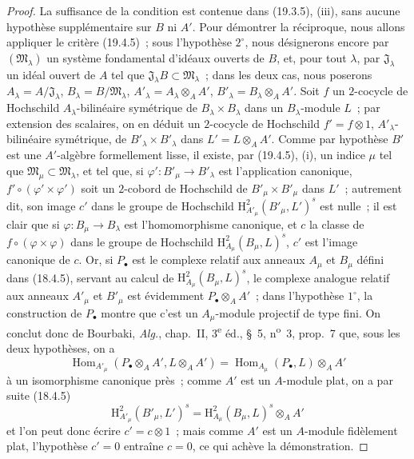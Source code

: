 \begin{proof}
La suffisance de la condition est contenue dans (19.3.5), (iii), sans aucune
hypothèse supplémentaire sur $B$ ni $A'$. Pour démontrer la réciproque, nous
allons appliquer le critère (19.4.5)~; sous l'hypothèse $2^\circ$, nous
désignerons encore par $(\mathfrak M_\lambda)$ un système fondamental
d'idéaux ouverts de $B$, et, pour tout $\lambda$, par
$\mathfrak J_\lambda$ un idéal ouvert de $A$ tel que
$\mathfrak J_\lambda B\subset\mathfrak M_\lambda$~; dans les deux
cas, nous poserons
$A_\lambda=A/\mathfrak J_\lambda$,
$B_\lambda=B/\mathfrak M_\lambda$,
$A'_\lambda=A_\lambda\otimes_A A'$,
$B'_\lambda=B_\lambda\otimes_A A'$. Soit $f$ un $2$-cocycle de
Hochschild $A_\lambda$-bilinéaire symétrique de
$B_\lambda\times B_\lambda$ dans un $B_\lambda$-module $L$~; par
extension des scalaires, on en déduit un $2$-cocycle de Hochschild
$f'=f\otimes1$, $A'_\lambda$-bilinéaire symétrique, de
$B'_\lambda\times B'_\lambda$ dans $L'=L\otimes_A A'$. Comme par
hypothèse $B'$ est une $A'$-algèbre formellement lisse, il existe, par (19.4.5),
(i), un indice $\mu$ tel que
$\mathfrak M_\mu\subset\mathfrak M_\lambda$, et tel que, si
$\varphi':B'_\mu\to B'_\lambda$ est l'application canonique,
$f'\circ(\varphi'\times\varphi')$ soit un $2$-cobord de Hochschild de
$B'_\mu\times B'_\mu$ dans $L'$~; autrement dit, son image $c'$ dans le
groupe de Hochschild
$\mathrm H^2_{A'_\mu}(B'_\mu,L')^s$ est nulle~; il est clair que si
$\varphi:B_\mu\to B_\lambda$ est l'homomorphisme canonique, et $c$ la
classe de $f\circ(\varphi\times\varphi)$ dans le groupe de Hochschild
$\mathrm H^2_{A_\mu}(B_\mu,L)^s$, $c'$ est l'image canonique de $c$.
Or, si $P_\bullet$ est le complexe relatif aux anneaux $A_\mu$ et
$B_\mu$ défini dans (18.4.5), servant au calcul de
$\mathrm H^2_{A_\mu}(B_\mu,L)^s$, le complexe analogue relatif aux
anneaux $A'_\mu$ et $B'_\mu$ est évidemment
$P_\bullet\otimes_A A'$~; dans l'hypothèse $1^\circ$, la construction de
$P_\bullet$ montre que c'est un $A_\mu$-module projectif de type fini.
On conclut donc de Bourbaki, \emph{Alg.}, chap.~II, 3\textsuperscript{e} éd., §~5,
n\textsuperscript{o}~3, prop.~7 que, sous les deux hypothèses, on a
\[
  \operatorname{Hom}_{A'_\mu}(P_\bullet\otimes_A A',L\otimes_A A')
  =\operatorname{Hom}_{A_\mu}(P_\bullet,L)\otimes_A A'
\]
à un isomorphisme canonique près~; comme $A'$ est un $A$-module plat, on a par
suite (18.4.5)
\[
  \mathrm H^2_{A'_\mu}(B'_\mu,L')^s
  =\mathrm H^2_{A_\mu}(B_\mu,L)^s\otimes_A A'
\]
et l'on peut donc écrire $c'=c\otimes1$~; mais comme $A'$ est un $A$-module
fidèlement plat, l'hypothèse $c'=0$ entraîne $c=0$, ce qui achève la
démonstration.
\end{proof}

